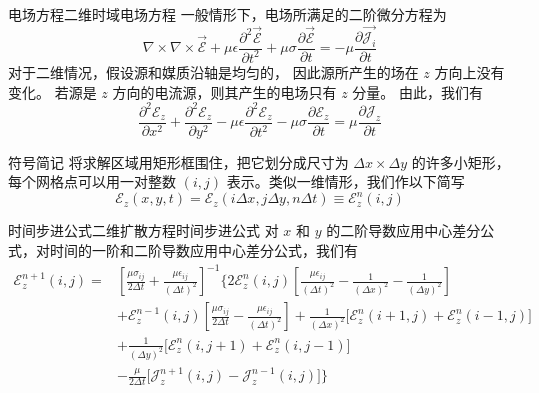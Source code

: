 \begin{definition}{电场方程}{二维时域电场方程}
    一般情形下，电场所满足的二阶微分方程为
    \begin{equation}
        \nabla \times \nabla \times \vec{\mathscr{E}}
        +\mu \epsilon \frac{\partial^2 \vec{\mathscr{E}}}{\partial t^2}
        +\mu \sigma \frac{\partial \vec{\mathscr{E}}}{\partial t}
        =-\mu \frac{\partial \vec{\mathscr{J}_i}}{\partial t}
    \end{equation}
    对于二维情况，假设源和媒质沿轴是均匀的，
    因此源所产生的场在 $z$ 方向上没有变化。
    若源是 $z$ 方向的电流源，则其产生的电场只有 $z$ 分量。
    由此，我们有
    \begin{equation}
        \frac{\partial^2 \mathscr{E}_z}{\partial x^2}
        +\frac{\partial^2 \mathscr{E}_z}{\partial y^2}
        -\mu \epsilon \frac{\partial^2 \mathscr{E}_z}{\partial t^2}
        -\mu \sigma \frac{\partial \mathscr{E}_z}{\partial t}
        =\mu \frac{\partial \mathscr{J}_z}{\partial t}
        \label{二维电场方程}
    \end{equation}
\end{definition}

\begin{definition}{符号简记}
    将求解区域用矩形框围住，把它划分成尺寸为 $\Delta x \times \Delta y$ 的许多小矩形，
    每个网格点可以用一对整数 $(i,j)$ 表示。类似一维情形，我们作以下简写
    \begin{equation}
        \mathscr{E}_z(x,y,t)=\mathscr{E}_z(i\Delta x,j\Delta y,n\Delta t)
        \equiv \mathscr{E}_z^n(i,j)
    \end{equation}
\end{definition}

\begin{theorem}{时间步进公式}{二维扩散方程时间步进公式}
    对 $x$ 和 $y$ 的二阶导数应用中心差分公式，对时间的一阶和二阶导数应用中心差分公式，我们有
    \begin{equation}
        \begin{aligned}
            \mathscr{E}_z^{n+1}(i,j)=
            &\left[\frac{\mu\sigma_{ij}}{2\Delta t}+\frac{\mu\epsilon_{ij}}{(\Delta t)^2}\right]^{-1}
            \Bigg\{2\mathscr{E}_z^n(i,j)\left[
                \frac{\mu\epsilon_{ij}}{(\Delta t)^2}
                -\frac{1}{(\Delta x)^2}-\frac{1}{(\Delta y)^2}
            \right]\\
            &+\mathscr{E}_z^{n-1}(i,j)\left[
                \frac{\mu\sigma_{ij}}{2\Delta t}-\frac{\mu\epsilon_{ij}}{(\Delta t)^2}
            \right]
            +\frac{1}{(\Delta x)^2}\Big[\mathscr{E}_z^{n}(i+1,j)+\mathscr{E}_z^{n}(i-1,j)\Big]\\
            &+\frac{1}{(\Delta y)^2}\Big[\mathscr{E}_z^{n}(i,j+1)+\mathscr{E}_z^{n}(i,j-1)\Big]\\
            &-\frac{\mu}{2\Delta t}\Big[\mathscr{J}_z^{n+1}(i,j)-\mathscr{J}_z^{n-1}(i,j)\Big]\Bigg\}
        \end{aligned}
    \end{equation}
\end{theorem}

